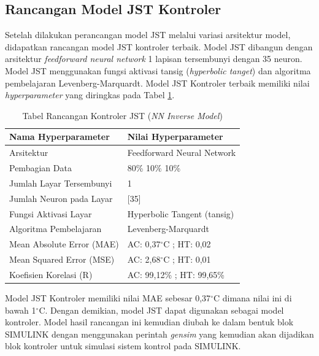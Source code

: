 \subsection{Rancangan Model JST Kontroler}

Setelah dilakukan perancangan model JST melalui variasi arsitektur model, didapatkan rancangan model JST kontroler terbaik. Model JST dibangun dengan arsitektur \textit{feedforward neural network} 1 lapisan tersembunyi dengan 35 neuron. Model JST menggunakan fungsi aktivasi tansig (\textit{hyperbolic tanget}) dan algoritma pembelajaran Levenberg-Marquardt. Model JST Kontroler terbaik memiliki nilai \textit{hyperparameter} yang diringkas pada Tabel \ref{tbl:5:NNControl}.
 
\begin{table}[!h]
	\caption{Tabel Rancangan Kontroler JST (\textit{NN Inverse Model})}
	\label{tbl:5:NNControl}
	\centering
	\begin{tabular}{|p{5.7cm}|p{5cm}|}
		\hline
		\textbf{Nama Hyperparameter} & \textbf{Nilai Hyperparameter} \\ \hline
		Arsitektur & Feedforward Neural Network \\ \hline
		Pembagian Data & 80\% 10\% 10\% \\ \hline 
		Jumlah Layar Tersembunyi & 1 \\ \hline
		Jumlah Neuron pada Layar & [35] \\ \hline
		Fungsi Aktivasi Layar & Hyperbolic Tangent (tansig) \\ \hline
		Algoritma Pembelajaran & Levenberg-Marquardt \\ \hline
		Mean Absolute Error (MAE) & AC: 0,37$^\circ$C ; HT: 0,02\\ \hline
		Mean Squared Error (MSE) & AC: 2,68$^\circ$C ; HT: 0,01\\ \hline
		Koefisien Korelasi (R) & AC: 99,12\% ; HT: 99,65\% \\ \hline
	\end{tabular}
\end{table}

Model JST Kontroler memiliki nilai MAE sebesar 0,37$^\circ$C dimana nilai ini di bawah 1$^\circ$C. Dengan demikian, model JST dapat digunakan sebagai model kontroler. Model hasil rancangan ini kemudian diubah ke dalam bentuk blok SIMULINK dengan menggunakan perintah \textit{gensim} yang kemudian akan dijadikan blok kontroler untuk simulasi sistem kontrol pada SIMULINK.\\
\break

